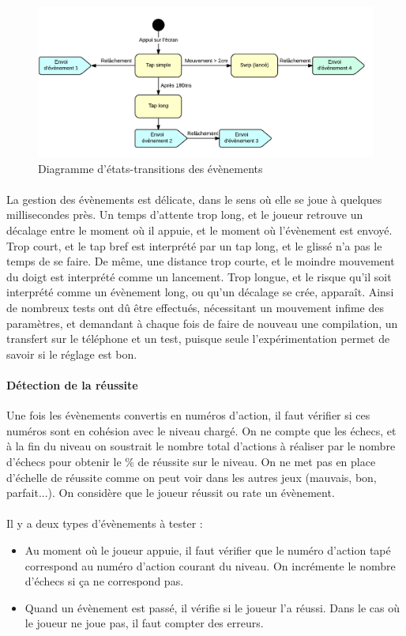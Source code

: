\begin{figure}[!htb]\centering
  \includegraphics[scale=0.7]{./img/diagEtatTransition.png}
  \caption{Diagramme d'états-transitions des évènements}
  \label{diagetattrans}
\end{figure}


\paragraph{}
La gestion des évènements est délicate, dans le sens où elle se joue à quelques millisecondes près. Un temps d'attente trop long, et le joueur retrouve un décalage entre le moment où il appuie, et le moment où l'évènement est envoyé. Trop court, et le tap bref est interprété par un tap long, et le glissé n'a pas le temps de se faire. De même, une distance trop courte, et le moindre mouvement du doigt est interprété comme un lancement. Trop longue, et le risque qu'il soit interprété comme un évènement long, ou qu'un décalage se crée, apparaît. Ainsi de nombreux tests ont dû être effectués, nécessitant un mouvement infime des paramètres, et demandant à chaque fois de faire de nouveau une compilation, un transfert sur le téléphone et un test, puisque seule l'expérimentation permet de savoir si le réglage est bon.

\paragraph{Détection de la réussite}
Une fois les évènements convertis en numéros d'action, il faut vérifier si ces numéros sont en cohésion avec le niveau chargé. On ne compte que les échecs, et à la fin du niveau on soustrait le nombre total d'actions à réaliser par le nombre d'échecs pour obtenir le \% de réussite sur le niveau.
On ne met pas en place d'échelle de réussite comme on peut voir dans les autres jeux (mauvais, bon, parfait...). On considère que le joueur réussit ou rate un évènement.\\\\
Il y a deux types d'évènements à tester :
\begin{itemize}
\item Au moment où le joueur appuie, il faut vérifier que le numéro d'action tapé correspond au numéro d'action courant du niveau. On incrémente le nombre d'échecs si ça ne correspond pas.
\item Quand un évènement est passé, il vérifie si le joueur l'a réussi. Dans le cas où le joueur ne joue pas, il faut compter des erreurs.
\end{itemize}
